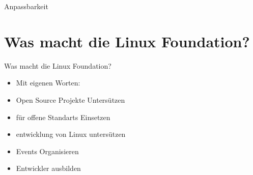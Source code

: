 \documentclass[11pt,aspectratio=169]{beamer}
\begin{document}
\begin{frame}{Anpassbarkeit}


\end{frame}
\section{Was macht die Linux Foundation?}

\begin{frame}{Was macht die Linux Foundation?}
	\begin{itemize}
		\item<1-> Mit eigenen Worten:\cite{About}
		\item<2-> Open Source Projekte Untersützen
		\item<3-> für offene Standarts Einsetzen
		\item <4->entwicklung von Linux untersützen
		\item<5-> Events Organisieren\cite{Events}
		\item<6-> Entwickler ausbilden\cite{Training}
	\end{itemize}

\end{frame}
\end{document}
